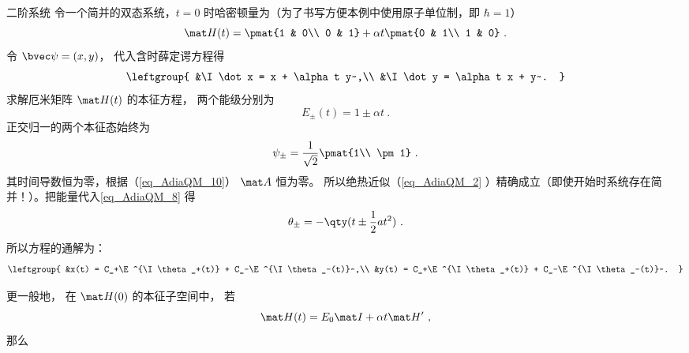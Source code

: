 
\begin{example}{二阶系统}
令一个简并的双态系统，$t=0$ 时哈密顿量为（为了书写方便本例中使用原子单位制，即 $\hbar=1$）
\begin{equation}
\mat H(t) = \pmat{1 & 0\\ 0 & 1}
+ \alpha t \pmat{0 & 1\\ 1 & 0}~.
\end{equation}
令 $\bvec\psi = (x,y)$， 代入含时薛定谔方程得
\begin{equation}
\leftgroup{
&\I\dot x = x + \alpha t y~,\\
&\I\dot y = \alpha t x + y~.
}\end{equation}
求解厄米矩阵 $\mat H(t)$ 的本征方程， 两个能级分别为
\begin{equation}
E_\pm(t) = 1 \pm \alpha t~.
\end{equation}
正交归一的两个本征态始终为
\begin{equation}
\psi_\pm = \frac{1}{\sqrt{2}}\pmat{1\\ \pm1}~.
\end{equation}
其时间导数恒为零，根据（\autoref{eq_AdiaQM_10}） $\mat A$ 恒为零。 所以绝热近似（\autoref{eq_AdiaQM_2} ）精确成立（即使开始时系统存在简并！）。把能量代入\autoref{eq_AdiaQM_8} 得
\begin{equation}
\theta_\pm = -\qty(t \pm \frac{1}{2}at^2)~.
\end{equation}
所以方程的通解为：
\begin{equation}
\leftgroup{
&x(t) = C_+\E^{\I\theta_+(t)} + C_-\E^{\I\theta_-(t)}~,\\
&y(t) = C_+\E^{\I\theta_+(t)} + C_-\E^{\I\theta_-(t)}~.
}\end{equation}
\end{example}

更一般地， 在 $\mat H(0)$ 的本征子空间中， 若
\begin{equation}
\mat H(t) = E_0\mat I + \alpha t \mat H'~,
\end{equation}
那么
